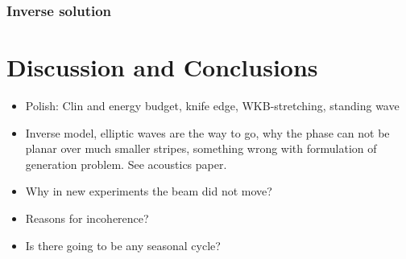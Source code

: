 \subsubsection{Inverse solution}

\section{Discussion and Conclusions}

\begin{itemize}
\item Polish: Clin and energy budget, knife edge, WKB-stretching, standing wave
\item Inverse model, elliptic waves are the way to go, why the phase can not be planar over much smaller stripes, something wrong with formulation of generation problem. See acoustics paper.
\item Why in new experiments the beam did not move?
\item Reasons for incoherence?
\item Is there going to be any seasonal cycle?
\end{itemize}




